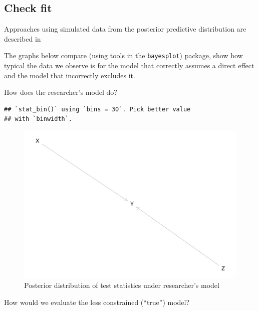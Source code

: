 \documentclass[12pt,]{book}
\newenvironment{Shaded}{\begin{snugshade}}{\end{snugshade}}
\newcommand{\KeywordTok}[1]{\textcolor[rgb]{0.13,0.29,0.53}{\textbf{#1}}}
\newcommand{\NormalTok}[1]{#1}
\newcommand{\OperatorTok}[1]{\textcolor[rgb]{0.81,0.36,0.00}{\textbf{#1}}}
\begin{document}
\hypertarget{check-fit}{%
\subsection{Check fit}\label{check-fit}}

Approaches using simulated data from the posterior predictive distribution are described in \citet{gabry2019visualization}

The graphs below compare (using tools in the \texttt{bayesplot}) package, show how typical the data we observe is for the model that correctly assumes a direct effect and the model that incorrectly excludes it.

How does the researcher's model do?

\begin{Shaded}
\end{Shaded}

\begin{verbatim}
## `stat_bin()` using `bins = 30`. Pick better value
## with `binwidth`.
\end{verbatim}

\begin{figure}
\centering
\includegraphics{ii_files/figure-latex/unnamed-chunk-119-1.pdf}
\caption{\label{fig:unnamed-chunk-119}Posterior distribution of test statistics under researcher's model}
\end{figure}

How would we evaluate the less constrained (``true'') model?
\end{document}
